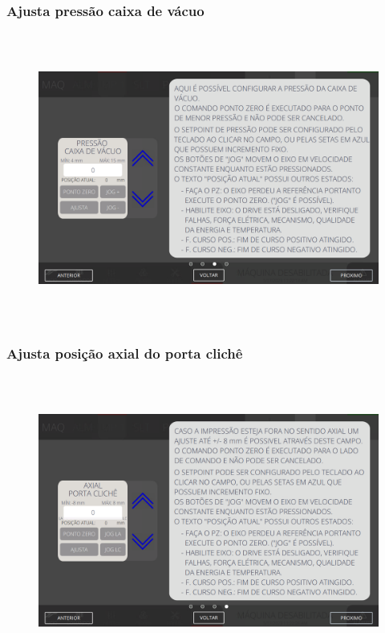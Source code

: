 \newpage
\thispagestyle{fancy}
\vspace*{\fill}
\subsubsection{\small{Ajusta pressão caixa de vácuo}}
\begin{figure}[h]
  \centering
  \includegraphics[width=576px,height=360px]{src/imagesFlexo/04-printter/02-printter/settings/e-3.png}
\end{figure}
\vspace*{\fill}

\newpage
\thispagestyle{fancy}
\vspace*{\fill}
\subsubsection{\small{Ajusta posição axial do porta clichê}}
\begin{figure}[h]
  \centering
  \includegraphics[width=576px,height=360px]{src/imagesFlexo/04-printter/02-printter/settings/e-4.png}
\end{figure}
\vspace*{\fill}
